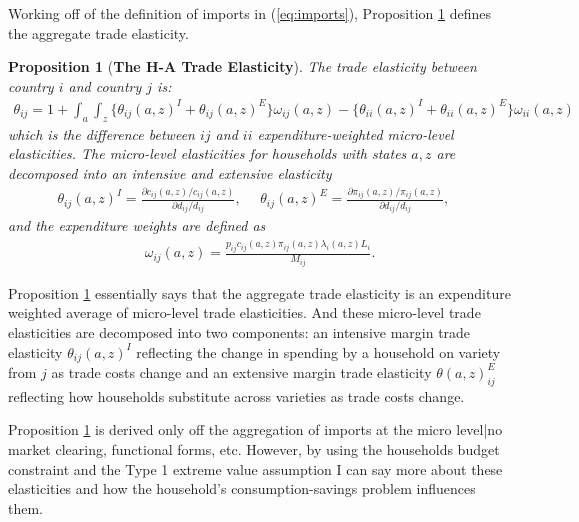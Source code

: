 \documentclass[12pt,pdftex]{article}
\newtheorem{prp}{Proposition}
\begin{document}
\begin{onehalfspacing}
Working off of the definition of imports in (\ref{eq:imports}), Proposition \ref{prp:GET} defines the aggregate trade elasticity.
\begin{prp}[\textbf{The H-A Trade Elasticity}] \label{prp:GET} The trade elasticity between country $i$ and country $j$ is:
{\footnotesize
\begin{align}
\theta_{ij} = 1 + \int_{a} \int_{z} \bigg \{ \theta_{ij}(a,z)^{I} + \theta_{ij}(a,z)^{E} \bigg \}\omega_{ij}(a,z) - \bigg \{ \theta_{ii}(a,z)^{I} + \theta_{ii}(a,z)^{E} \bigg \}\omega_{ii}(a,z)
\label{eq:trade-elasticity}
\end{align}
}which is the difference between $ij$ and $ii$ expenditure-weighted micro-level elasticities. The micro-level elasticities for households with states $a,z$ are decomposed into an intensive and extensive elasticity
{\footnotesize
\begin{align}
\nonumber
\theta_{ij}(a,z)^{I} = \frac{\partial c_{ij}(a,z)/ c_{ij}(a,z)}{\partial d_{ij} / d_{ij}}, \ \ \ \ \ \ \theta_{ij}(a,z)^{E} = \frac{\partial \pi_{ij}(a,z) / \pi_{ij}(a,z)}{\partial d_{ij} / d_{ij}}, \ \ \ \
\end{align}
}
and the expenditure weights are defined as
{\footnotesize
\begin{align}
\nonumber
\omega_{ij}(a,z) = \frac{p_{ij}c_{ij}(a,z)\pi_{ij}(a,z) \lambda_{i}(a,z) L_i}{M_{ij}}.
\end{align}
}
\end{prp}
Proposition \ref{prp:GET} essentially says that the aggregate trade elasticity is an expenditure weighted average of micro-level trade elasticities. And these micro-level trade elasticities are decomposed into two components: an intensive margin trade elasticity $\theta_{ij}(a,z)^{I}$ reflecting the change in spending by a household on variety from $j$ as trade costs change and an extensive margin trade elasticity $\theta(a,z)_{ij}^{E}$ reflecting how households substitute across varieties as trade costs change.

Proposition \ref{prp:GET} is derived only off the aggregation of imports at the micro level|no market clearing, functional forms, etc. However, by using the households budget constraint and the Type 1 extreme value assumption I can say more about these elasticities and how the household's consumption-savings problem influences them.


\end{onehalfspacing}
\end{document}
